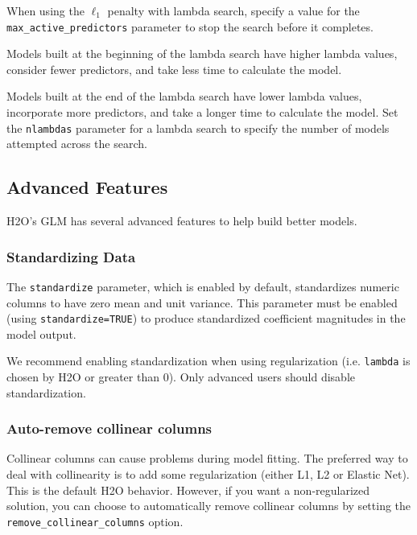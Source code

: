 When using the $\ell_1$ penalty with lambda search, specify a value for the \\ \texttt{max\_active\_predictors} parameter to stop the search before it completes.  

Models built at the beginning of the lambda search have higher lambda values, consider fewer predictors, and take less time to calculate the model. 

Models built at the end of the lambda search have
lower lambda values, incorporate more predictors, and take a longer time to calculate the model. Set the \texttt{nlambdas} parameter for a lambda search to specify the number of models attempted across the search.

\waterExampleInR


\waterExampleInPython


\subsection{Advanced Features}

H2O's GLM has several advanced features to help build better models.
\subsubsection{Standardizing Data}

The \texttt{standardize} parameter, which is enabled by default, standardizes numeric columns to have zero mean and
unit variance.  This parameter must be enabled (using \texttt{standardize=TRUE}) to produce standardized coefficient magnitudes in the model output.

We recommend enabling standardization when using regularization (i.e. \texttt{lambda} is chosen by H2O or greater than 0). Only advanced users should disable standardization.

\subsubsection{Auto-remove collinear columns}
Collinear columns can cause problems during model fitting. The preferred way to deal with collinearity is to add some
regularization (either L1, L2 or Elastic Net). This is the default H2O behavior. However, if you want a non-regularized
solution, you can choose to automatically remove collinear columns by setting the \texttt{remove\_collinear\_columns}
option.

